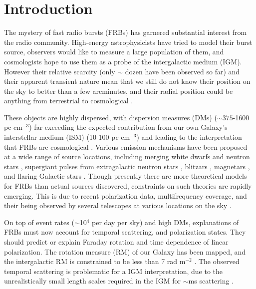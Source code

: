 \documentclass[useAMS,usenatbib]{mn2e}
\begin{document}
\newcommand{\be}{\begin{eqnarray}}
\newcommand{\ee}{\end{eqnarray}}
\newcommand{\beq}{\begin{equation}}
\newcommand{\eeq}{\end{equation}}

\section{Introduction}
The mystery of fast radio bursts (FRBs) has garnered
substantial interest from the radio community.
High-energy astrophysicists have tried to model their burst source, 
observers would like to measure a large population of them, and cosmologists
hope to use them as a probe of the intergalactic medium (IGM). However their relative scarcity 
(only $\sim$ dozen have been observed so far) and their apparent 
transient nature mean that we still do not know their position on the sky
to better than a few arcminutes, and their radial position could be anything
from terrestrial to cosmological \citep{2014ApJ...797...70K}.

These objects are
highly dispersed, with dispersion measures (DMs) ($\sim 375$-1600 pc cm$^{-3}$) far exceeding
the expected contribution from our own Galaxy's interstellar medium (ISM) (10-100 pc cm$^{-3}$) and leading to the
interpretation that FRBs are cosmological \citep{2007Sci...318..777L, 2013Sci...341...53T}. 
Various emission mechanisms have been proposed 
at a wide range of source locations, 
including merging white dwarfs \citep{2013ApJ...776L..39K}
and neutron stars \citep{2013PASJ...65L..12T}, supergiant pulses 
from extragalactic neutron stars \citep{2015arXiv150100753C},
blitzars \citep{2014A&A...562A.137F}, 
magnetars \citep{2007arXiv0710.2006P, 2014MNRAS.442L...9L, 2015arXiv150101341P}, 
and flaring Galactic stars \citep{2014MNRAS.439L..46L}. 
Though presently there are more theoretical models for FRBs than actual 
sources discovered, constraints on such theories are rapidly emerging. 
This is due to recent polarization data, 
multifrequency coverage, and their being observed by several telescopes
at various locations on the sky \citep{2014ApJ...780L...2B, 2015MNRAS.447..246P}. 

On top of event rates ($\sim$10$^4$ per day per sky) 
and high DMs, explanations of FRBs must now
account for temporal scattering, and polarization states.  They should
predict or explain Faraday rotation and time dependence of linear polarization.
The rotation measure (RM) of our Galaxy has been mapped, and the
intergalactic RM is constrained to be less than 7 rad m$^{-2}$
\citep{2015A&A...575A.118O}. 
The observed temporal scattering is problematic for a IGM interpretation, due 
to the unrealistically small length scales required in the IGM 
for $\sim$ms scattering \citep{2014ApJ...785L..26L}. 
\end{document}
